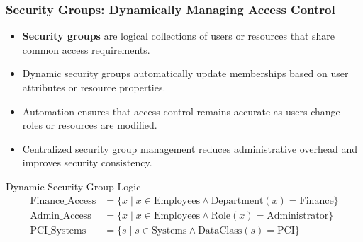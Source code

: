 \documentclass{beamer}
\begin{document}
\begin{frame}
  \frametitle{Security Groups: Dynamically Managing Access Control}
  
  \begin{itemize}
    \item \textbf{Security groups} are logical collections of users or resources that share common access requirements.
    \item Dynamic security groups automatically update memberships based on user attributes or resource properties.
    \item Automation ensures that access control remains accurate as users change roles or resources are modified.
    \item Centralized security group management reduces administrative overhead and improves security consistency.
  \end{itemize}
  
  \begin{block}{Dynamic Security Group Logic}
    \scriptsize
    \begin{align}
      \text{Finance\_Access} &= \{x \mid x \in \text{Employees} \wedge \text{Department}(x) = \text{Finance}\} \\
      \text{Admin\_Access} &= \{x \mid x \in \text{Employees} \wedge \text{Role}(x) = \text{Administrator}\} \\
      \text{PCI\_Systems} &= \{s \mid s \in \text{Systems} \wedge \text{DataClass}(s) = \text{PCI}\}
    \end{align}
  \end{block}
\end{frame}
\end{document}
